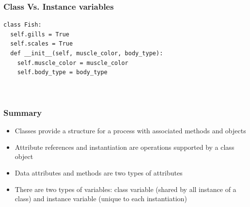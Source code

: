 \documentclass{beamer}
\begin{document}
\begin{frame}[fragile]
\frametitle{Class Vs. Instance variables}

\begin{Verbatim}
class Fish:
  self.gills = True
  self.scales = True
  def __init__(self, muscle_color, body_type):
    self.muscle_color = muscle_color
    self.body_type = body_type

		
\end{Verbatim}




\end{frame}


\begin{frame}
\frametitle{Summary}

\begin{itemize}
\item Classes provide a structure for a process with associated methods and objects
\item Attribute references and instantiation are operations supported by a class object
\item Data attributes and methods are two types of attributes
\item There are two types of variables: class variable (shared by all instance of a class) and instance variable (unique to each instantiation)
\end{itemize}


\end{frame}
\end{document}

